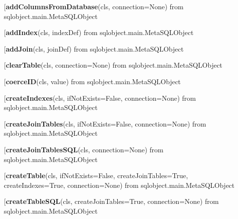 \begin{description}\item[{\bf addColumnsFromDatabase}(cls, connection=None) from sqlobject.main.MetaSQLObject\end{description}

\begin{description}\item[{\bf addIndex}(cls, indexDef) from sqlobject.main.MetaSQLObject\end{description}

\begin{description}\item[{\bf addJoin}(cls, joinDef) from sqlobject.main.MetaSQLObject\end{description}

\begin{description}\item[{\bf clearTable}(cls, connection=None) from sqlobject.main.MetaSQLObject\end{description}

\begin{description}\item[{\bf coerceID}(cls, value) from sqlobject.main.MetaSQLObject\end{description}

\begin{description}\item[{\bf createIndexes}(cls, ifNotExists=False, connection=None) from sqlobject.main.MetaSQLObject\end{description}

\begin{description}\item[{\bf createJoinTables}(cls, ifNotExists=False, connection=None) from sqlobject.main.MetaSQLObject\end{description}

\begin{description}\item[{\bf createJoinTablesSQL}(cls, connection=None) from sqlobject.main.MetaSQLObject\end{description}

\begin{description}\item[{\bf createTable}(cls, ifNotExists=False, createJoinTables=True, createIndexes=True, connection=None) from sqlobject.main.MetaSQLObject\end{description}

\begin{description}\item[{\bf createTableSQL}(cls, createJoinTables=True, connection=None) from sqlobject.main.MetaSQLObject\end{description}

